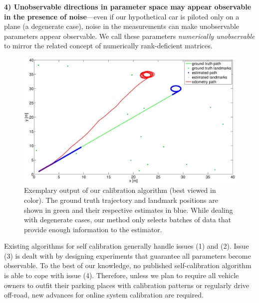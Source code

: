 {\bf 4) Unobservable directions in parameter space may appear observable in the
presence of noise}---even if our hypothetical car is piloted only on a plane (a
degenerate case), noise in the measurements can make unobservable parameters
appear observable. We call these parameters {\em numerically unobservable} to
mirror the related concept of numerically rank-deficient matrices.

\begin{figure}[t]
\centering
\includegraphics[width=\columnwidth]{fig/straight-loop-path-result.eps}
\caption{Exemplary output of our calibration algorithm (best viewed in
color). The ground truth trajectory and landmark positions are shown in green
and their respective estimates in blue. While dealing with degenerate cases, our
method only selects batches of data that provide enough information to the
estimator.}
\label{fig:calib_demo}
\end{figure}

Existing algorithms for self calibration generally handle issues (1) and (2).
Issue (3) is dealt with by designing experiments that guarantee all parameters
become observable. To the best of our knowledge, no published self-calibration
algorithm is able to cope with issue (4). Therefore, unless we plan to require
all vehicle owners to outfit their parking places with calibration patterns or
regularly drive off-road, new advances for online system calibration are
required.

